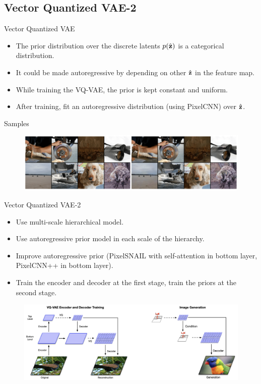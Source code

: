 \subsection{Vector Quantized VAE-2}
\begin{frame}{Vector Quantized VAE}
	\begin{itemize}
		\item The prior distribution over the discrete latents $p(\hat{\mathbf{z}})$ is a categorical distribution.
		\item It could be made autoregressive by depending on other $\hat{\mathbf{z}}$ in the feature map. 
		\item While training the VQ-VAE, the prior is kept constant and uniform. 
		\item After training, fit an autoregressive distribution (using PixelCNN) over $\hat{\mathbf{z}}$.
	\end{itemize}
	\begin{block}{Samples}
		\begin{figure}
			\centering
			\includegraphics[width=\linewidth]{figs/vqvae_results}
		\end{figure}
	\end{block}

\end{frame}
\begin{frame}{Vector Quantized VAE-2}
	\begin{itemize}
		\item Use multi-scale hierarchical model.
		\item Use autoregressive prior model in each scale of the hierarchy.
		\item Improve autoregressive prior (PixelSNAIL with self-attention in bottom layer, PixelCNN++ in bottom layer).
		\item Train the encoder and decoder at the first stage, train the priors at the second stage.
	\end{itemize}
	\begin{figure}
		\centering
		\includegraphics[width=\linewidth]{figs/vqvae2}
	\end{figure}
\end{frame}
